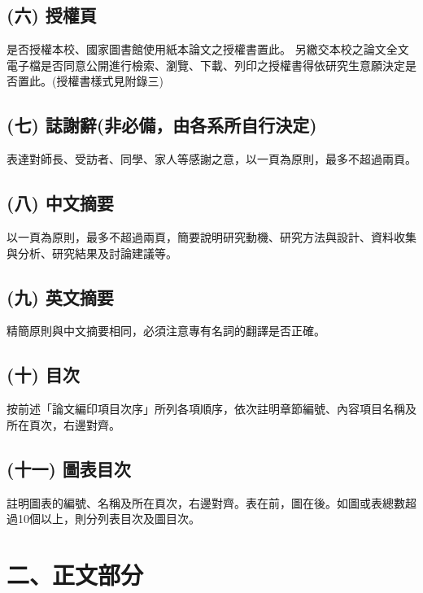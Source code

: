 \documentclass[12pt,oneside,openany,a4paper]{book}
\begin{document}
\subsection{(六) 授權頁}
是否授權本校、國家圖書館使用紙本論文之授權書置此。
另繳交本校之論文全文電子檔是否同意公開進行檢索、瀏覽、下載、列印之授權書得依研究生意願決定是否置此。(授權書樣式見附錄三)

\subsection{(七) 誌謝辭(非必備，由各系所自行決定)}
表達對師長、受訪者、同學、家人等感謝之意，以一頁為原則，最多不超過兩頁。

\subsection{(八) 中文摘要}
以一頁為原則，最多不超過兩頁，簡要說明研究動機、研究方法與設計、資料收集與分析、研究結果及討論建議等。

\subsection{(九) 英文摘要}
精簡原則與中文摘要相同，必須注意專有名詞的翻譯是否正確。

\subsection{(十) 目次}
按前述「論文編印項目次序」所列各項順序，依次註明章節編號、內容項目名稱及所在頁次，右邊對齊。

\subsection{(十一) 圖表目次}
註明圖表的編號、名稱及所在頁次，右邊對齊。表在前，圖在後。如圖或表總數超過10個以上，則分列表目次及圖目次。

\section{二、正文部分}
\end{document}
